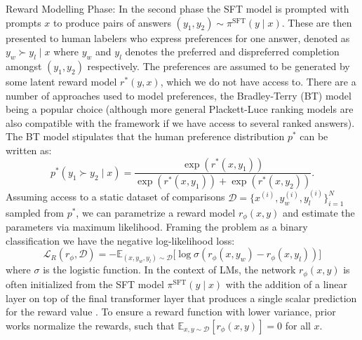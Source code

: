 \documentclass{article}
\begin{document}
Reward Modelling Phase: In the second phase the SFT model is prompted with prompts $x$ to produce pairs of answers $(y_1, y_2)\sim \pi^\text{SFT}(y \mid x)$. These are then presented to human labelers who express preferences for one answer, denoted as $y_w\succ y_l \mid x$ where $y_w$ and $y_l$ denotes the preferred and dispreferred completion amongst $(y_1, y_2)$ respectively. The preferences are assumed to be generated by some latent reward model $r^*(y, x)$, which we do not have access to. There are a number of approaches used to model preferences, the Bradley-Terry (BT) \cite{bradley1952rankanalysis} model being a popular choice (although more general Plackett-Luce ranking models \citep{plackett1975analysis, luce2012individual} are also compatible with the framework if we have access to several ranked answers). The BT model stipulates that the human preference distribution $p^*$ can be written as:
\begin{equation}\label{eq:bradley-terry}
    p^*(y_1\succ y_2 \mid x)=\frac{\exp\left(r^*(x, y_1)\right)}{\exp\left(r^*(x, y_1)\right) + \exp\left(r^*(x, y_2)\right)}.
\end{equation}
Assuming access to a static dataset of comparisons $\mathcal{D}=\bigl\{x^{(i)}, y_w^{(i)}, y_l^{(i)}\bigr\}_{i=1}^N$ sampled from $p^*$, we can parametrize a reward model $r_{\phi}(x, y)$ and estimate the parameters via maximum likelihood. Framing the problem as a binary classification we have the negative log-likelihood loss:
\begin{equation}\label{eq:reward_model}
    \mathcal{L}_R(r_{\phi}, \mathcal{D}) = -\mathbb{E}_{(x, y_w, y_l)\sim \mathcal{D}}\bigl[\log \sigma(r_{\phi}(x, y_w)- r_{\phi}(x, y_l))\bigr]
\end{equation}
where $\sigma$ is the logistic function. In the context of LMs, the network $r_{\phi}(x, y)$ is often initialized from the SFT model $\pi^\text{SFT}(y \mid x)$ with the addition of a linear layer on top of the final transformer layer that produces a single scalar prediction for the reward value \cite{ziegler2020finetuning}. To ensure a reward function with lower variance, prior works normalize the rewards, such that  $\mathbb{E}_{x,y\sim \mathcal{D}}\left[r_\phi(x, y)\right] = 0$ for all $x$.
\end{document}
